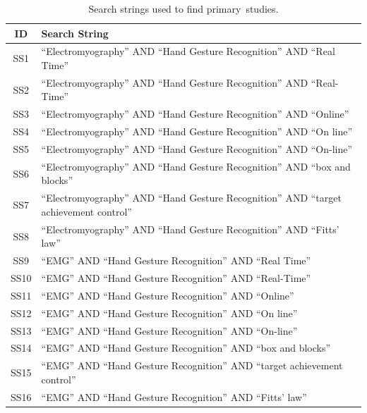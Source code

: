 \documentclass[sensors,review,accept,moreauthors,pdftex]{Definitions/mdpi}
\begin{document}
\begin{table}[H]
	\centering
	\caption{Search strings used to find primary~studies.}
	\label{tab:1}

	\begin{tabular}{cl}
	
		\toprule
		\textbf{ID}&\textbf{Search String}\\
		
		\midrule
		SS1 & “Electromyography” AND “Hand Gesture Recognition” AND “Real Time” \\
		
		SS2 & “Electromyography” AND “Hand Gesture Recognition” AND “Real-Time” \\
		
		SS3 & “Electromyography” AND “Hand Gesture Recognition” AND “Online” \\
		
		SS4 & “Electromyography” AND “Hand Gesture Recognition” AND “On line” \\
		
		SS5 &“Electromyography” AND “Hand Gesture Recognition” AND “On-line” \\
		
		SS6 &“Electromyography” AND “Hand Gesture Recognition” AND “box and blocks” \\
		
		SS7 &“Electromyography” AND “Hand Gesture Recognition” AND “target achievement control” \\
		
		SS8 &“Electromyography” AND “Hand Gesture Recognition” AND “Fitts' law” \\
		
		SS9 &“EMG” AND “Hand Gesture Recognition” AND “Real Time” \\
		
		SS10 &“EMG” AND “Hand Gesture Recognition” AND “Real-Time” \\
		
		SS11&“EMG” AND “Hand Gesture Recognition” AND “Online” \\
		
		SS12 &“EMG” AND “Hand Gesture Recognition” AND “On line” \\
		
		SS13 &“EMG” AND “Hand Gesture Recognition” AND “On-line” \\
		
		SS14 &“EMG” AND “Hand Gesture Recognition” AND “box and blocks” \\
		
		SS15 &“EMG” AND “Hand Gesture Recognition” AND “target achievement control” \\
		
		SS16 &“EMG” AND “Hand Gesture Recognition” AND “Fitts' law” \\
		\bottomrule
		
		
	\end{tabular}
\end{table}
\end{document}
